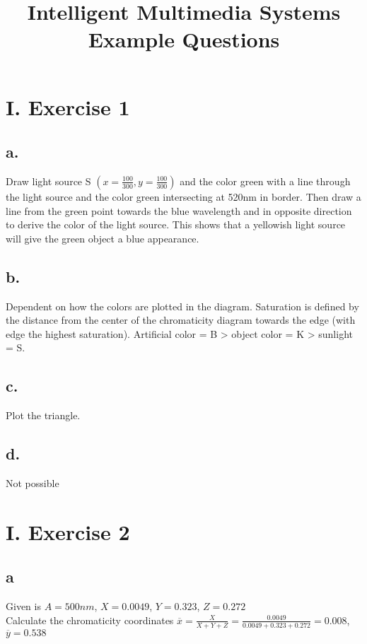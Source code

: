 \documentclass[a4paper,11pt]{article}
\title{Intelligent Multimedia Systems \\ Example Questions}
\newcommand{\ol}{\overline}
\begin{document}
	\maketitle
	
	\section*{I. Exercise 1}
	
	\subsection*{a.} Draw light source S $(x=\frac{100}{300}, y=\frac{100}{300})$ and the color green with a line through the light source and the color green intersecting at 520nm in border.  Then draw a line from the green point towards the blue wavelength and in opposite direction to derive the color of the light source. This shows that a yellowish light source will give the green object a blue appearance.
	
	\subsection*{b.} Dependent on how the colors are plotted in the diagram. Saturation is defined by the distance from the center of the chromaticity diagram towards the edge (with edge the highest saturation). Artificial color = B > object color = K > sunlight = S.

	\subsection*{c.} 
		Plot the triangle.
	
	\subsection*{d.} 
		Not possible
	
	\section*{I. Exercise 2}
	
	\subsection*{a}
		Given is $A=500nm$, $X=0.0049$, $Y=0.323$, $Z=0.272$ \\
		Calculate the chromaticity coordinates $\ol{x}=\frac{X}{X+Y+Z}=\frac{0.0049}{0.0049+0.323+0.272}=0.008$, $\ol{y}=0.538$
\end{document}
